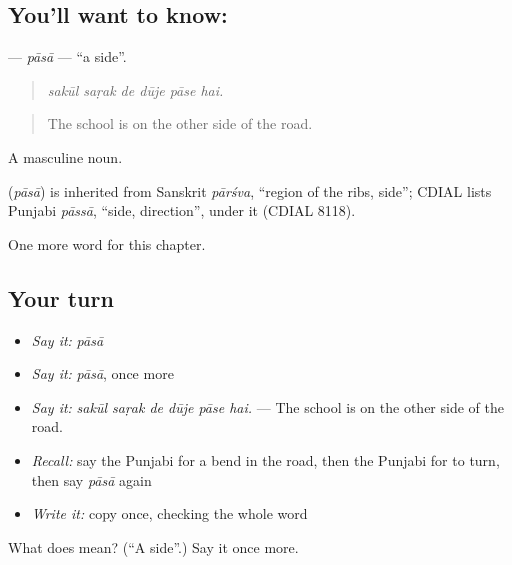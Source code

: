 \subsection*{You'll want to know: }
\textbf{} — \emph{pāsā} — \textquotedblleft{}a side\textquotedblright{}.

\begin{quote}
     
\end{quote}

\begin{quote}
\emph{sakūl saṛak de dūje pāse hai.}
\end{quote}

\begin{quote}
The school is on the other side of the road.
\end{quote}

A masculine noun.

\begin{cousinweb}
\textbf{} (\emph{pāsā}) is inherited from Sanskrit \emph{pārśva}, \textquotedblleft{}region of the ribs, side\textquotedblright{}; CDIAL lists Punjabi \emph{pāssā}, \textquotedblleft{}side, direction\textquotedblright{}, under it (CDIAL 8118).
\end{cousinweb}

\begin{grammarlens}[title={What you've built}]
One more word for this chapter.
\end{grammarlens}

\subsection*{Your turn}
\begin{itemize}
\raggedright
  \item \emph{Say it:} \emph{pāsā}
  \item \emph{Say it:} \emph{pāsā}, once more
  \item \emph{Say it:} \emph{sakūl saṛak de dūje pāse hai.} — The school is on the other side of the road.
  \item \emph{Recall:} say the Punjabi for a bend in the road, then the Punjabi for to turn, then say \emph{pāsā} again
  \item \emph{Write it:} copy \textbf{} once, checking the whole word
\end{itemize}

\begin{tcolorbox}[breakable,colback=teal!4,colframe=teal!35!black,title={Before you move on}]
What does  mean? (\textquotedblleft{}A side\textquotedblright{}.) Say it once more.
\end{tcolorbox}
